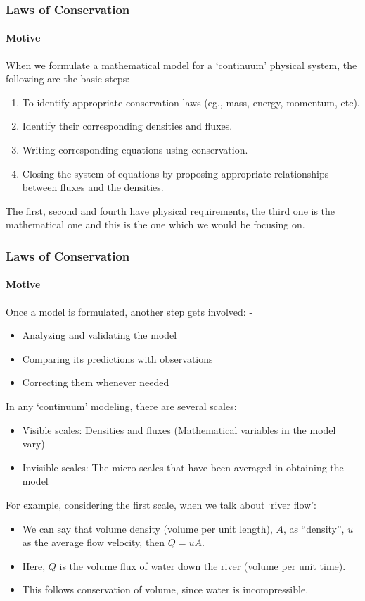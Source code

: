 \documentclass[10pt]{beamer}
\begin{document}
\begin{frame}
    \frametitle{Laws of Conservation}
    \framesubtitle{Motive}
    When we formulate a mathematical model for a ‘continuum’ physical system, the following are the basic steps:

    \begin{enumerate}
        \item To identify appropriate conservation laws (eg., mass, energy, momentum, etc).
        \item Identify their corresponding densities and fluxes.
        \item Writing corresponding equations using conservation.
        \item Closing the system of equations by proposing appropriate relationships between fluxes and the densities.
    \end{enumerate}
    The first, second and fourth have physical requirements, the third one is the mathematical one and this is the one which we would be focusing on.
\end{frame}

\begin{frame}
    \fontsize{9pt}{10pt}\selectfont
    \frametitle{Laws of Conservation}
    \framesubtitle{Motive}
    Once a model is formulated, another step gets involved: -

    \begin{itemize}
        \item Analyzing and validating the model
        \item Comparing its predictions with observations
        \item Correcting them whenever needed
    \end{itemize}

    In any ‘continuum’ modeling, there are several scales:

    \begin{itemize}
        \item Visible scales: Densities and fluxes (Mathematical variables in the model vary)
        \item Invisible scales: The micro-scales that have been averaged in obtaining the model
    \end{itemize}

    For example, considering the first scale, when we talk about ‘river flow’:

    \begin{itemize}
        \item We can say that volume density (volume per unit length), $A$, as “density”, $u$ as the average flow velocity, then $Q = uA$.
        \item Here, $Q$  is the volume flux of water down the river (volume per unit time).
        \item This follows conservation of volume, since water is incompressible.
    \end{itemize}
\end{frame}
\end{document}
